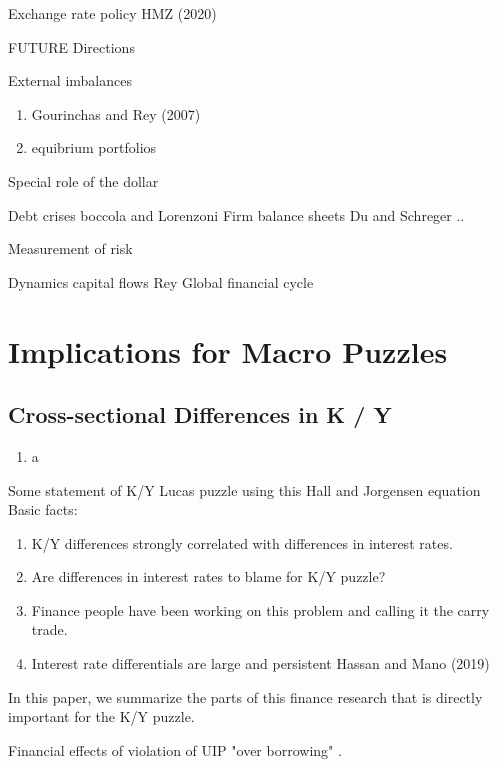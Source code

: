 \documentclass[12pt,letter]{article}
\theoremstyle{break} \theorembodyfont{\normalfont\itshape}
\theoremstyle{break}
\theoremstyle{break} \theorembodyfont{\normalfont\itshape}
\theoremstyle{break} \theorembodyfont{\normalfont\itshape}
\begin{document}
Exchange rate policy
HMZ (2020)

FUTURE Directions 

External imbalances
\begin{enumerate}
    \item Gourinchas and Rey (2007)
    \item equibrium portfolios
\end{enumerate}

Special role of the dollar

Debt crises
boccola and Lorenzoni
Firm balance sheets
Du and Schreger ..


Measurement of risk



Dynamics capital flows
Rey
Global financial cycle





\section{Implications for Macro Puzzles}

\subsection{Cross-sectional Differences in K / Y}
\begin{enumerate}
    \item a
\end{enumerate}
Some statement of K/Y Lucas puzzle using this Hall and Jorgensen equation
Basic facts:
\begin{enumerate}
    \item K/Y differences strongly correlated with differences in interest rates.
    \item Are differences in interest rates to blame for K/Y puzzle?
    \item Finance people have been working on this problem and calling it the carry trade.
    \item Interest rate differentials are large and persistent  Hassan and Mano (2019)
\end{enumerate}
In this paper, we summarize the parts of this finance research that is directly important for the K/Y puzzle.



Financial effects of violation of UIP
"over borrowing"
.
\end{document}
